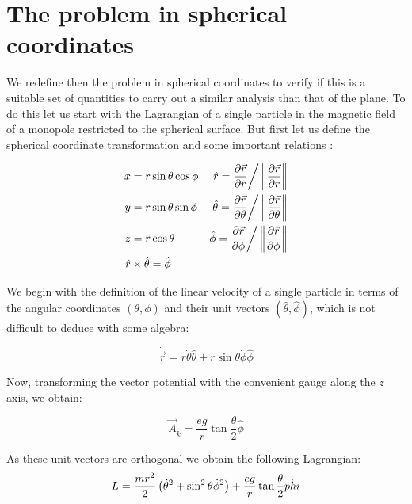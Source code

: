 \section{The problem in spherical coordinates}
We redefine then the problem in spherical coordinates to verify if this is a suitable set of quantities to carry out a similar analysis than that of the plane. To do this let us start with the Lagrangian of a single particle in the magnetic field of a monopole restricted to the spherical surface. But first let us define the spherical coordinate transformation and some important relations \cite{sphericalcoordinates}:

\begin{align*}
x &= r\sin{\theta}\cos{\phi} & \hat{r} = \frac{\partial \vec{r}}{\partial r}\bigg/\left\lVert \frac{\partial \vec{r}}{\partial r} \right\rVert\\
y &= r\sin{\theta}\sin{\phi} & \hat{\theta} = \frac{\partial \vec{r}}{\partial \theta}\bigg/\left\lVert \frac{\partial \vec{r}}{\partial \theta} \right\rVert \\
z &= r\cos{\theta} & \hat{\phi} = \frac{\partial \vec{r}}{\partial \phi}\bigg/\left\lVert \frac{\partial \vec{r}}{\partial \phi} \right\rVert\\
\hat{r}&\times \hat{\theta} = \hat{\phi}
\end{align*}

We begin with the definition of the  linear velocity of a single particle in terms of the angular coordinates $(\theta,\phi)$ and their unit vectors $(\hat{\theta},\hat{\phi})$, which is not difficult to deduce with some algebra:

\begin{equation}
\dot{\vec{r}} = r\dot{\theta}\hat{\theta} + r\sin{\theta}\dot{\phi}\hat{\phi}
\end{equation}

Now, transforming the vector potential with the convenient gauge along the $z$ axis, we obtain:

\begin{equation*}
\vec{A}_{\hat{k}} = \frac{eg}{r}\tan{\frac{\theta}{2}}\hat{\phi}
\end{equation*}

As these unit vectors are orthogonal we obtain the following Lagrangian:\\

\begin{equation*}
L = \frac{mr^2}{2}\left( \dot{\theta}^2 + \sin^2\theta \dot{\phi}^2 \right) + \frac{eg}{r}\tan{\frac{\theta}{2}\dot{phi}}
\end{equation*}

